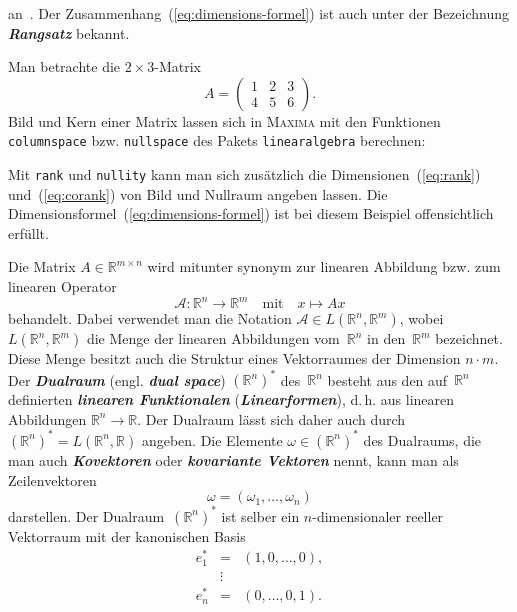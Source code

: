 an~\cite{lorenz1992,beutelspacher2001}.
Der Zusammenhang~(\ref{eq:dimensions-formel})
ist auch unter der Bezeichnung \textbf{\em Rangsatz} bekannt.
\begin{example}
\label{exa:Bild-und-Kern}Man betrachte die $2\times3$-Matrix
\[
A=\left(\begin{array}{ccc}
1 & 2 & 3\\
4 & 5 & 6
\end{array}\right).
\]
Bild und Kern einer Matrix lassen sich in \textsc{Maxima} mit den
Funktionen \texttt{columnspace} bzw. \texttt{nullspace} des Pakets
\texttt{linearalgebra} berechnen:



Mit \texttt{rank} und \texttt{nullity} kann man sich zusätzlich die
Dimensionen~(\ref{eq:rank}) und~(\ref{eq:corank}) von Bild und
Nullraum angeben lassen. Die Dimensionsformel~(\ref{eq:dimensions-formel})
ist bei diesem Beispiel offensichtlich erfüllt.

\end{example}
Die Matrix $A\in{\mathbb{R}}^{m\times n}$ wird mitunter synonym zur linearen
Abbildung bzw. zum linearen Operator
\[
\mathcal{A}:{\mathbb{R}}^{n}\to{\mathbb{R}}^{m}\quad\text{mit}\quad x\mapsto Ax
\]
behandelt.
Dabei verwendet man die Notation $\mathcal{A}\in L({\mathbb{R}}^{n},{\mathbb{R}}^{m})$,
wobei $L({\mathbb{R}}^{n},{\mathbb{R}}^{m})$ die Menge der linearen Abbildungen vom~${\mathbb{R}}^{n}$
in den~${\mathbb{R}}^{m}$ bezeichnet. Diese Menge besitzt auch die Struktur
eines Vektorraumes der Dimension $n\cdot m$.
Der \textbf{\em Dualraum} (engl. \textbf{\em dual space}) $({\mathbb{R}}^{n})^{*}$
des~${\mathbb{R}}^{n}$ besteht aus den auf~${\mathbb{R}}^{n}$ definierten \textbf{\em linearen
Funktionalen} (\textbf{\em Linearformen}), d.\,h. aus linearen Abbildungen
${\mathbb{R}}^{n}\to{\mathbb{R}}$.
Der Dualraum lässt sich daher auch durch $({\mathbb{R}}^{n})^{*}=L({\mathbb{R}}^{n},{\mathbb{R}})$
angeben.
Die Elemente $\omega\in({\mathbb{R}}^{n})^{*}$ des Dualraums, die
man auch \textbf{\em Kovektoren} oder \textbf{\em kovariante
Vektoren} nennt, kann man als Zeilenvektoren
\[
\omega=\left(\omega_{1},\ldots,\omega_{n}\right)
\]
darstellen.
Der Dualraum~$({\mathbb{R}}^{n})^{*}$ ist selber ein $n$-dimensionaler
reeller Vektorraum mit der kanonischen Basis
\[
\begin{array}{lcl}
e_{1}^{*} & = & \left(1,0,\ldots,0\right),\\
 & \vdots\\
e_{n}^{*} & = & (0,\ldots,0,1).
\end{array}
\]
